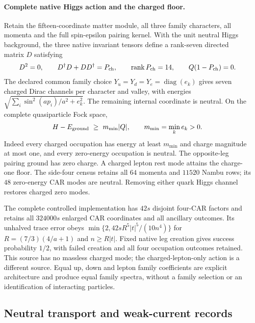 \paragraph{Complete native Higgs action and the charged floor.}
Retain the fifteen-coordinate matter module, all three family characters,
all momenta and the full spin-epsilon pairing kernel.  With the unit
neutral Higgs background, the three native invariant tensors define a
rank-seven directed matrix $D$ satisfying
\[
 D^2=0,\qquad D^\dagger D+DD^\dagger=P_{\rm ch},\qquad
 \operatorname{rank}P_{\rm ch}=14,\qquad Q(1-P_{\rm ch})=0.
\]
The declared common family choice $Y_u=Y_d=Y_e=\operatorname{diag}(e_k)$
gives seven charged Dirac channels per character and valley, with
energies $\sqrt{\sum_i\sin^2(ap_i)/a^2+e_k^2}$.  The remaining internal
coordinate is neutral.  On the complete quasiparticle Fock space,
\[
 H-E_{\rm ground}\ \geq\ m_{\min}|Q|,\qquad m_{\min}=\min_k e_k>0.
\]
Indeed every charged occupation has energy at least $m_{\min}$ and
charge magnitude at most one, and every zero-energy occupation is
neutral.  The opposite-leg pairing ground has zero charge.  A charged
lepton rest mode attains the charge-one floor.  The side-four census
retains all $64$ momenta and $11520$ Nambu rows; its $48$ zero-energy
CAR modes are neutral.  Removing either quark Higgs channel restores
charged zero modes.

The complete controlled implementation has $42s$ disjoint four-CAR
factors and retains all $324000s$ enlarged CAR coordinates and all
ancillary outcomes.  Its unhalved trace error obeys
$\min\{2,42sR^5|t|^5/(10n^4)\}$ for
$R=(7/3)(4/a+1)$ and $n\geq R|t|$.  Fixed native leg creation gives
success probability $1/2$, with failed creation and all four occupation
outcomes retained.  This source has no massless charged mode; the
charged-lepton-only action is a different source.  Equal up, down and
lepton family coefficients are explicit architecture and produce equal
family spectra, without a family selection or an identification of
interacting particles.


\subsection{Neutral transport and weak-current records}


